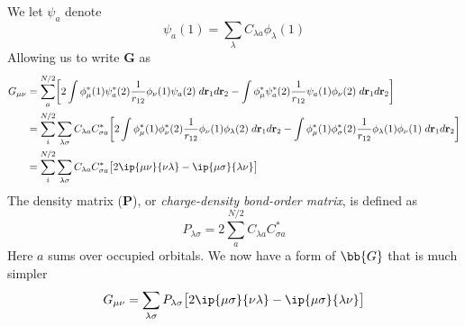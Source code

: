 \documentclass[11pt]{article}
\begin{document}
We let $\psi_a$ denote
\begin{equation}
\psi_a(1)=\sum_\lambda C_{\lambda a} \phi_{\lambda}(1)
\end{equation}
Allowing us to write $\mathbf{G}$ as
\begin{align*}
G_{\mu \nu} &= \sum_{a}^{N/2}\biggl[2 \int \phi_\mu^* (1) \psi_a^*(2) \frac{1}{r_{12}}\phi_{\nu}(1)\psi_a(2)\; d\mathbf{r}_1d\mathbf{r}_2 - \int \phi_\mu^* \psi_a^*(2) \frac{1}{r_{12}}\psi_a(1)\phi_\nu(2)\;  d\mathbf{r}_1d\mathbf{r}_2\biggr]\\
&= \sum_{i}^{N/2}\sum_{\lambda \sigma} C_{\lambda a}C_{\sigma a}^* \bigg[ 2\int\phi_{\mu}^*(1) \phi_{\nu}^*(2) \frac{1}{r_{12}}\phi_{\nu}(1)\phi_{\lambda}(2)\; d\mathbf{r}_1d\mathbf{r}_2 - \int \phi_{\mu}^*(1) \phi_{\sigma}^*(2) \frac{1}{r_{12}}\phi_{\lambda}(1)\phi_{\nu}(1)\; d\mathbf{r}_1d\mathbf{r}_2\bigg]\\
&= \sum_{i}^{N/2}\sum_{\lambda \sigma} C_{\lambda a}C_{\sigma a}^*  \big[ 2\ip{\mu \nu}{\nu \lambda}-\ip{\mu \sigma}{\lambda \nu} \big] 
\end{align*}
The density matrix (\textbf{P}), or \textit{charge-density bond-order matrix}, is defined as 
\begin{equation}\label{eq:densmat}
P_{\lambda \sigma} = 2 \sum_{a}^{N/2}C_{\lambda a}C_{\sigma a}^*
\end{equation}
Here $a$ sums over occupied orbitals. We now have a form of $\bb{G}$ that is much simpler
\begin{equation}
G_{\mu \nu} = \sum_{\lambda \sigma} P_{\lambda \sigma} \big[ 2 \ip{\mu \sigma}{\nu \lambda}-\ip{\mu \sigma}{\lambda \nu}\big]
\end{equation}
\end{document}
